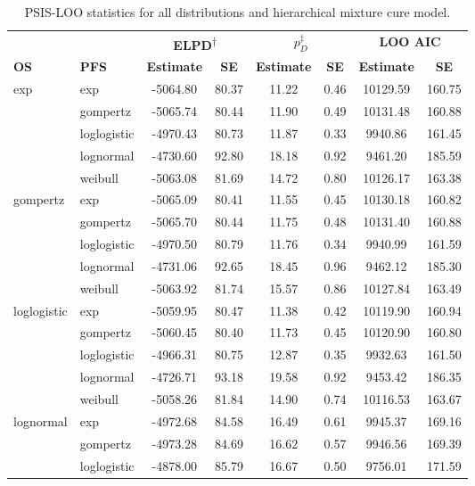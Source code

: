 \documentclass[AMA,STIX1COL]{WileyNJD-v2}
\begin{document}
\begin{table}[H]
\caption{PSIS-LOO statistics for all distributions and hierarchical mixture cure model. \label{tab:loo_hier}}
\centering
\begin{tabular}{l l c c c c c c}
\toprule
\multicolumn{1}{l}{} & \multicolumn{1}{l}{} & \multicolumn{2}{c}{\textbf{ELPD\textsuperscript{$\dagger$}}} & \multicolumn{2}{c}{\textbf{$p_D^{\ddagger}$}} & \multicolumn{2}{c}{\textbf{LOO AIC}} \\
\cmidrule{3-4}\cmidrule{5-6}\cmidrule{7-8}
\textbf{OS} & \textbf{PFS} & \textbf{Estimate} & \textbf{SE} & \textbf{Estimate} & \textbf{SE} & \textbf{Estimate} & \textbf{SE}\\
\midrule
exp & exp & -5064.80 & 80.37 & 11.22 & 0.46 & 10129.59 & 160.75\\
 & gompertz & -5065.74 & 80.44 & 11.90 & 0.49 & 10131.48 & 160.88\\
 & loglogistic & -4970.43 & 80.73 & 11.87 & 0.33 & 9940.86 & 161.45\\
 & lognormal & -4730.60 & 92.80 & 18.18 & 0.92 & 9461.20 & 185.59\\
 & weibull & -5063.08 & 81.69 & 14.72 & 0.80 & 10126.17 & 163.38\\
gompertz & exp & -5065.09 & 80.41 & 11.55 & 0.45 & 10130.18 & 160.82\\
 & gompertz & -5065.70 & 80.44 & 11.75 & 0.48 & 10131.40 & 160.88\\
 & loglogistic & -4970.50 & 80.79 & 11.76 & 0.34 & 9940.99 & 161.59\\
 & lognormal & -4731.06 & 92.65 & 18.45 & 0.96 & 9462.12 & 185.30\\
 & weibull & -5063.92 & 81.74 & 15.57 & 0.86 & 10127.84 & 163.49\\
loglogistic & exp & -5059.95 & 80.47 & 11.38 & 0.42 & 10119.90 & 160.94\\
 & gompertz & -5060.45 & 80.40 & 11.73 & 0.45 & 10120.90 & 160.80\\
 & loglogistic & -4966.31 & 80.75 & 12.87 & 0.35 & 9932.63 & 161.50\\
 & lognormal & -4726.71 & 93.18 & 19.58 & 0.92 & 9453.42 & 186.35\\
 & weibull & -5058.26 & 81.84 & 14.90 & 0.74 & 10116.53 & 163.67\\
lognormal & exp & -4972.68 & 84.58 & 16.49 & 0.61 & 9945.37 & 169.16\\
 & gompertz & -4973.28 & 84.69 & 16.62 & 0.57 & 9946.56 & 169.39\\
 & loglogistic & -4878.00 & 85.79 & 16.67 & 0.50 & 9756.01 & 171.59\\

\end{tabular}
\end{table}
\end{document}
